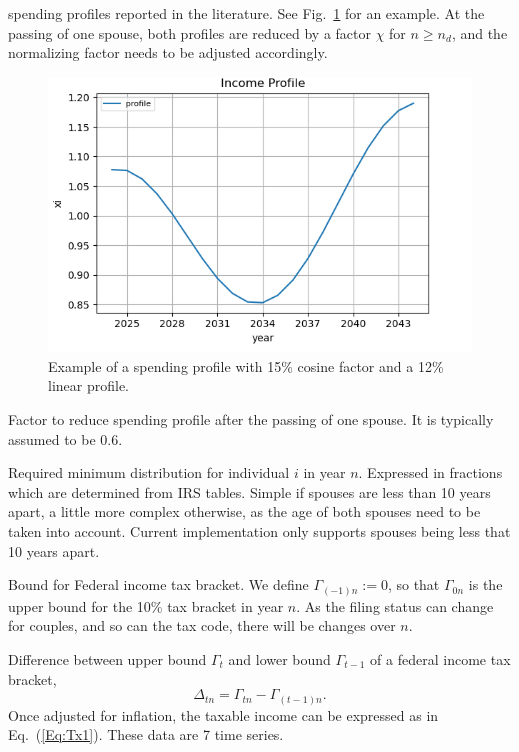\documentclass{article}[fleqn,12pt]
\begin{document}
\begin{description}[leftmargin=4em,style=multiline]
		spending profiles reported in the literature. See Fig.~\ref{Fig:profile} for an example.
	At the passing of one spouse, both profiles are reduced by a factor $\chi$ for $n \ge n_d$,
	and the normalizing factor needs to be adjusted accordingly.
		\begin{figure}[t]
		\includegraphics{profile.png}
		\caption{\small Example of a spending profile with 15\% cosine factor and a 12\% linear
		profile. \label{Fig:profile}}
		\end{figure}
\item [$\chi$]
	Factor to reduce spending profile after the passing of one spouse. It is typically
	assumed to be 0.6.
\item [$\rho_{in}$]
	Required minimum distribution for individual $i$ in year $n$. Expressed in fractions
	which are determined from IRS tables. Simple if spouses are less than 10 years apart,
	a little more complex otherwise, as the age of both spouses need to be taken into account.
	Current implementation only supports spouses being less that 10 years apart.
\item [$\Gamma_{tn}$]
	Bound for Federal income tax bracket. We define $\Gamma_{(-1)n} := 0$, so that
	$\Gamma_{0n}$ is the upper bound for the 10\% tax bracket in year $n$. As the filing status
	can change for couples, and so can the tax code, there will be changes over $n$.
\item [$\Delta_{tn}$]
	Difference between upper bound $\Gamma_t$ and lower bound $\Gamma_{t-1}$
	of a federal income tax bracket,
	\begin{equation}
		\Delta_{tn} = \Gamma_{tn} - \Gamma_{(t-1)n}.
	\end{equation}
	Once adjusted for inflation,
	the taxable income can be expressed as in Eq.~(\ref{Eq:Tx1}). These data are 7 time series.

\end{description}
\end{document}
